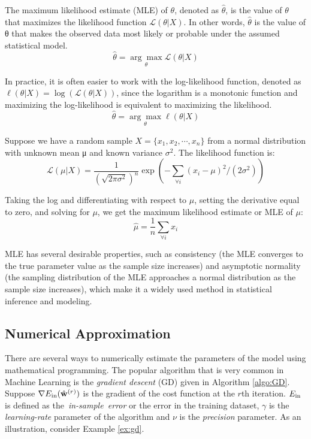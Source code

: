 The maximum likelihood estimate (MLE) of $\theta$, denoted as $\hat{\theta}$, is the value of $\theta$ that maximizes the likelihood function $\mathcal{L}(\theta | X)$. In other words, $\hat{\theta}$ is the value of θ that makes the observed data most likely or probable under the assumed statistical model.
\begin{equation}
    \hat{\theta} = \underset{\theta}{\arg\max} \mathcal{L}(\theta | X)    
\end{equation}

In practice, it is often easier to work with the log-likelihood function, denoted as $\ell(\theta | X) = \log(\mathcal{L}(\theta | X))$, since the logarithm is a monotonic function and maximizing the log-likelihood is equivalent to maximizing the likelihood.
\begin{equation}
   \hat{\theta} = \underset{\theta}{\arg\max}\ell(\theta | X)    
\end{equation}
\begin{exmp}
    Suppose we have a random sample $X = \{x_1, x_2,\cdots, x_n\}$ from a normal distribution with unknown mean μ and known variance $\sigma^2$. The likelihood function is:
    \begin{equation}
        \mathcal{L}(\mu | X) = \frac{1}{(\sqrt{2\pi\sigma^2})^n}\exp\left(-\sum_{\forall i}(x_i - \mu)^2 / (2\sigma^2)\right)
    \end{equation}
    
    Taking the log and differentiating with respect to $\mu$, setting the derivative equal to zero, and solving for $\mu$, we get the maximum likelihood estimate or MLE of $\mu$:
    \begin{equation}
        \hat{\mu} = \frac{1}{n}\sum_{\forall i}x_i
    \end{equation}
\end{exmp}
MLE has several desirable properties, such as consistency (the MLE converges to the true parameter value as the sample size increases) and asymptotic normality (the sampling distribution of the MLE approaches a normal distribution as the sample size increases), which make it a widely used method in statistical inference and modeling.
\subsection{Numerical Approximation}
There are several ways to numerically estimate the parameters of the model using mathematical programming. The popular algorithm that is very common in Machine Learning is the \textit{gradient descent} (GD) given in Algorithm \ref{algo:GD}. Suppose $\nabla E_{\mathrm{in}}(\hat{\mathbf{w}}^{(r)})$ is the gradient of the cost function at the $r$th iteration. $E_{\mathrm{in}}$ is defined as \mbox{the \textit{in-sample error}} or the error in the training dataset, $\gamma$ is the \textit{learning-rate} parameter of the algorithm and $\nu$ is the \textit{precision} parameter. As an illustration, consider Example \ref{ex:gd}.\vspace{.4cm}


